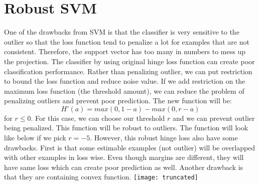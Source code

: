 \documentclass{article}
\begin{document}
\section{Robust SVM}
One of the drawbacks from SVM is that the classifier is very sensitive to the outlier so that the loss function tend to penalize a lot for examples that are not consistent. Therefore, the support vector has too many in numbers to mess up the projection. The classifier by using original hinge loss function can create poor classification performance. Rather than penalizing outlier, we can put restriction to bound the loss function and reduce noise value. If we add restriction on the maximum loss function (the threshold amount), we can reduce the problem of penalizing outliers and prevent poor prediction. The new function will be: $$H'(a) = max(0, 1 - a) - max(0 , r - a)$$ for $r \leqslant 0$. For this case, we can choose our threshold $r$ and we can prevent outlier being penalized. This function will be robust to outliers. The function will look like below if we pick $r = -5$. However, this robust hinge loss also have some drawbacks. First is that some estimable examples (not outlier) will be overlapped with other examples in loss wise. Even though margins are different, they will have same loss which can create poor prediction as well. Another drawback is that they are containing convex function. 
\texttt{[image: truncated]}
\end{document}
